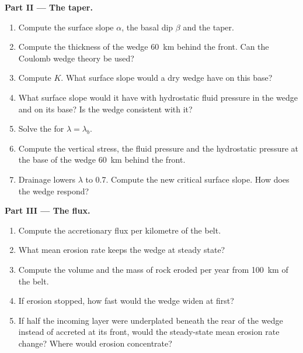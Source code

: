 \begin{problem}
\medskip\noindent\textbf{Part II --- The taper.}
\begin{enumerate}[resume]
  \item Compute the surface slope $\alpha$, the basal dip $\beta$ and the
        taper.
  \item Compute the thickness of the wedge \qty{60}{km} behind the front. Can
        the Coulomb wedge theory be used?
  \item Compute $K$. What surface slope would a dry wedge have on this base?
  \item What surface slope would it have with hydrostatic fluid pressure in
        the wedge and on its base? Is the wedge consistent with it?
  \item Solve the  for $\lambda = \lambda_b$.
  \item Compute the vertical stress, the fluid pressure and the hydrostatic
        pressure at the base of the wedge \qty{60}{km} behind the front.
  \item Drainage lowers $\lambda$ to 0.7. Compute the new critical surface
        slope. How does the wedge respond?
\end{enumerate}

\medskip\noindent\textbf{Part III --- The flux.}
\begin{enumerate}[resume]
  \item Compute the accretionary flux per kilometre of the belt.
  \item What mean erosion rate keeps the wedge at steady state?
  \item Compute the volume and the mass of rock eroded per year from
        \qty{100}{km} of the belt.
  \item If erosion stopped, how fast would the wedge widen at first?
  \item If half the incoming layer were underplated beneath the rear of the
        wedge instead of accreted at its front, would the steady-state mean
        erosion rate change? Where would erosion concentrate?
\end{enumerate}


\end{problem}
